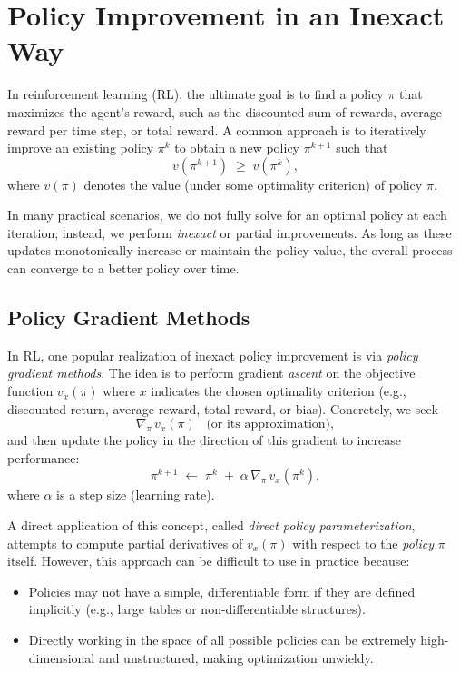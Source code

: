 \section{Policy Improvement in an Inexact Way}
\label{sec:policy_improvement_inexact}

In reinforcement learning (RL), the ultimate goal is to find a policy $\pi$ that maximizes the agent's reward, such as the discounted sum of rewards, average reward per time step, or total reward. A common approach is to iteratively improve an existing policy $\pi^k$ to obtain a new policy $\pi^{k+1}$ such that
\[
  v(\pi^{k+1}) \;\ge\; v(\pi^k),
\]
where $v(\pi)$ denotes the value (under some optimality criterion) of policy $\pi$. 

In many practical scenarios, we do not fully solve for an optimal policy at each iteration; instead, we perform \emph{inexact} or partial improvements. As long as these updates monotonically increase or maintain the policy value, the overall process can converge to a better policy over time. 

\subsection{Policy Gradient Methods}
\label{sec:policy_gradient}

In RL, one popular realization of inexact policy improvement is via \emph{policy gradient methods}. The idea is to perform gradient \emph{ascent} on the objective function  $v_x(\pi)$ 
where $x$ indicates the chosen optimality criterion (e.g., discounted return, average reward, total reward, or bias). Concretely, we seek
\[
  \nabla_\pi \, v_x(\pi) \;\;\; \text{(or its approximation)},
\]
and then update the policy in the direction of this gradient to increase performance:
\[
  \pi^{k+1} \;\leftarrow\; \pi^k \;+\; \alpha \,\nabla_\pi \,v_x(\pi^k),
\]
where $\alpha$ is a step size (learning rate). 

A direct application of this concept, called \emph{direct policy parameterization}, attempts to compute partial derivatives of $v_x(\pi)$ with respect to the \emph{policy} $\pi$ itself. However, this approach can be difficult to use in practice because:

\begin{itemize}
  \item Policies may not have a simple, differentiable form if they are defined implicitly (e.g., large tables or non-differentiable structures).
  \item Directly working in the space of all possible policies can be extremely high-dimensional and unstructured, making optimization unwieldy.
\end{itemize}

